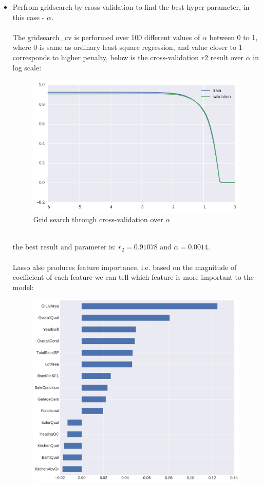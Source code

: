 \documentclass[12pt]{article}
\begin{document}
\begin{itemize}
\item Perfrom gridsearch by cross-validation\cite{gs} to find the best hyper-parameter, in this case - $\alpha$.\\
\\
The gridsearch\_cv is performed over 100 different values of $\alpha$ between 0 to 1, where 0 is same as ordinary least square regression, and value closer to 1 corresponds to higher penalty, below is the cross-validation $r2$ result over $\alpha$ in log scale:
\begin{figure}[h!]
	\centering
	\includegraphics[width=0.65\linewidth]{alpha.png}
	\caption{Grid search through cross-validation over $\alpha$}
	\label{fig:5}
\end{figure}\\
the best result and parameter is: $r_2=0.91078$ and $\alpha=0.0014$.\\
\\
Lasso also produces feature importance, i.e. based on the magnitude of coefficient of each feature we can tell which feature is more important to the model:
\begin{figure}[h!]
	\centering
	\includegraphics[width=0.8\linewidth]{fts_imp.png}

\end{figure}
\end{itemize}
\end{document}
